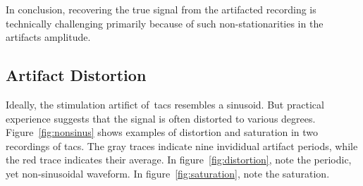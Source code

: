 \documentclass[a4paper]{article}
\begin{document}
In conclusion, recovering the true signal from the artifacted recording is technically challenging primarily because of such non-stationarities in the artifacts amplitude.

\subsection{Artifact Distortion}

Ideally, the stimulation artifict of~\gls{tacs} resembles a sinusoid. But practical experience suggests that the signal is often distorted to various degrees.
Figure~\ref{fig:nonsinus} shows examples of distortion and saturation in two recordings of \gls{tacs}. The gray traces indicate nine invididual artifact periods, while the red trace indicates their average. In figure~\ref{fig:distortion}, note the periodic, yet non-sinusoidal waveform. In figure~\ref{fig:saturation}, note the saturation.
\end{document}
